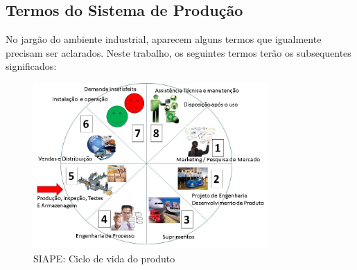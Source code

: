 	

\subsection{Termos do Sistema de Produção}	

No jargão do ambiente industrial, aparecem alguns termos que igualmente precisam ser aclarados. Neste trabalho, os seguintes termos terão os subsequentes significados:

\begin{figure}
	\centering
	\includegraphics[width=0.8\textwidth]{img/F6_SIAPE_Ciclo_de_vida_do_Produto.jpg} 
	\caption{SIAPE: Ciclo de vida do produto}
	\label{F6}
\end{figure}
	
